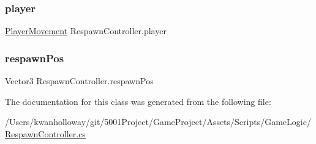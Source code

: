 \mbox{\label{class_respawn_controller_a7f20cfbf2b2f102a367ae8e842b25c4d}} 
\subsubsection{\texorpdfstring{player}{player}}
{\footnotesize\ttfamily \hyperlink{class_player_movement}{Player\+Movement} Respawn\+Controller.\+player}

\mbox{\label{class_respawn_controller_adc58760c896aea8b02aece81e68e1983}} 
\subsubsection{\texorpdfstring{respawn\+Pos}{respawnPos}}
{\footnotesize\ttfamily Vector3 Respawn\+Controller.\+respawn\+Pos}



The documentation for this class was generated from the following file\+:\begin{DoxyCompactItemize}
\item 
/\+Users/kwanholloway/git/5001\+Project/\+Game\+Project/\+Assets/\+Scripts/\+Game\+Logic/\hyperlink{_respawn_controller_8cs}{Respawn\+Controller.\+cs}\end{DoxyCompactItemize}

